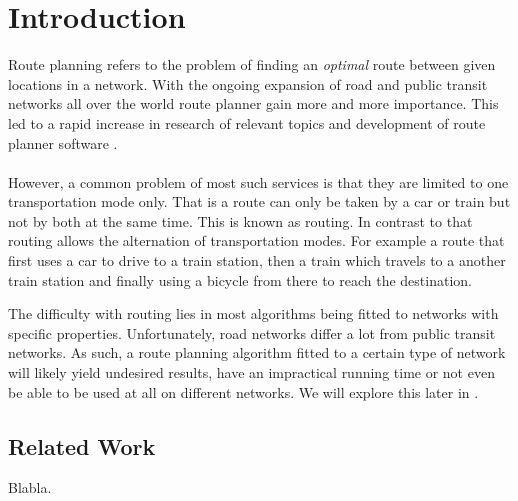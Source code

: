 \chapter{Introduction}\label{introduction}
	Route planning refers to the problem of finding an \textit{optimal} route between given locations in a network.
	With the ongoing expansion of road and public transit networks all over the world route planner gain more and
	more importance. This led to a rapid increase in research 
	of relevant topics and development of route planner software .\\\\
	However, a common problem of most such services is that they are limited to one transportation mode only.
	That is a route can only be taken by a car or train but not by both at the same time. This is known as \uniModal routing.
	In contrast to that \multiModal routing allows the alternation of transportation modes. For example a route that
	first uses a car to drive to a train station, then a train which travels to a another train station and finally
	using a bicycle from there to reach the destination.
	
	The difficulty with \multiModal routing lies in most algorithms being fitted to networks with specific properties.
	Unfortunately, road networks differ a lot from public transit networks. As such, a route planning algorithm
	fitted to a certain type of network will likely yield undesired results, have an impractical running time or not
	even be able to be used at all on different networks. We will explore this later in .

\section{Related Work}
Blabla.


